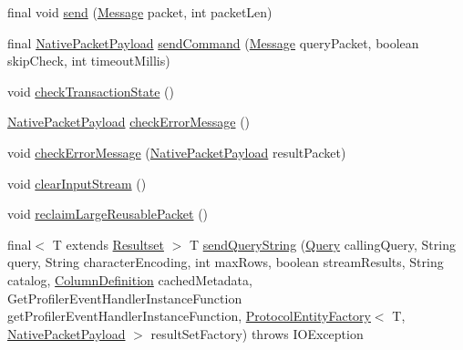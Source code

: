 \begin{DoxyCompactItemize}
\item 
final void \mbox{\hyperlink{classcom_1_1mysql_1_1cj_1_1protocol_1_1a_1_1_native_protocol_ab8fc56f3c8cbc5abba6cb7c485f534f1}{send}} (\mbox{\hyperlink{interfacecom_1_1mysql_1_1cj_1_1protocol_1_1_message}{Message}} packet, int packet\+Len)
\item 
final \mbox{\hyperlink{classcom_1_1mysql_1_1cj_1_1protocol_1_1a_1_1_native_packet_payload}{Native\+Packet\+Payload}} \mbox{\hyperlink{classcom_1_1mysql_1_1cj_1_1protocol_1_1a_1_1_native_protocol_ad0ee17f4275b06e46244520a03a6afdd}{send\+Command}} (\mbox{\hyperlink{interfacecom_1_1mysql_1_1cj_1_1protocol_1_1_message}{Message}} query\+Packet, boolean skip\+Check, int timeout\+Millis)
\item 
void \mbox{\hyperlink{classcom_1_1mysql_1_1cj_1_1protocol_1_1a_1_1_native_protocol_a35b9f6130a7d43685fc77c67f99ea23e}{check\+Transaction\+State}} ()
\item 
\mbox{\hyperlink{classcom_1_1mysql_1_1cj_1_1protocol_1_1a_1_1_native_packet_payload}{Native\+Packet\+Payload}} \mbox{\hyperlink{classcom_1_1mysql_1_1cj_1_1protocol_1_1a_1_1_native_protocol_a7c2558549dd31879ef27e087724c3c44}{check\+Error\+Message}} ()
\item 
void \mbox{\hyperlink{classcom_1_1mysql_1_1cj_1_1protocol_1_1a_1_1_native_protocol_a51128705ba4a4490581947a160c3137c}{check\+Error\+Message}} (\mbox{\hyperlink{classcom_1_1mysql_1_1cj_1_1protocol_1_1a_1_1_native_packet_payload}{Native\+Packet\+Payload}} result\+Packet)
\item 
void \mbox{\hyperlink{classcom_1_1mysql_1_1cj_1_1protocol_1_1a_1_1_native_protocol_ac54e352021183973a60e75d606b61b0d}{clear\+Input\+Stream}} ()
\item 
void \mbox{\hyperlink{classcom_1_1mysql_1_1cj_1_1protocol_1_1a_1_1_native_protocol_abe920baf0e942a3f227a86051078c7d5}{reclaim\+Large\+Reusable\+Packet}} ()
\item 
final$<$ T extends \mbox{\hyperlink{interfacecom_1_1mysql_1_1cj_1_1protocol_1_1_resultset}{Resultset}} $>$ T \mbox{\hyperlink{classcom_1_1mysql_1_1cj_1_1protocol_1_1a_1_1_native_protocol_a30e77ec54f66714f55e8f1c0872b8cfe}{send\+Query\+String}} (\mbox{\hyperlink{interfacecom_1_1mysql_1_1cj_1_1_query}{Query}} calling\+Query, String query, String character\+Encoding, int max\+Rows, boolean stream\+Results, String catalog, \mbox{\hyperlink{interfacecom_1_1mysql_1_1cj_1_1protocol_1_1_column_definition}{Column\+Definition}} cached\+Metadata, Get\+Profiler\+Event\+Handler\+Instance\+Function get\+Profiler\+Event\+Handler\+Instance\+Function, \mbox{\hyperlink{interfacecom_1_1mysql_1_1cj_1_1protocol_1_1_protocol_entity_factory}{Protocol\+Entity\+Factory}}$<$ T, \mbox{\hyperlink{classcom_1_1mysql_1_1cj_1_1protocol_1_1a_1_1_native_packet_payload}{Native\+Packet\+Payload}} $>$ result\+Set\+Factory)  throws I\+O\+Exception 

\end{DoxyCompactItemize}
